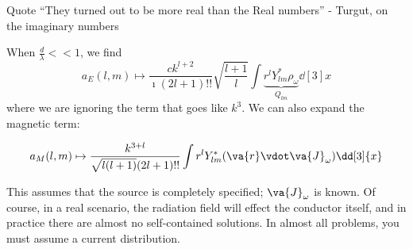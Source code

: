 \documentclass[a4paper,twoside,master.tex]{subfiles}
\begin{document}
\begin{note}{Quote}
    ``They turned out to be more real than the Real numbers''
    - Turgut, on the imaginary numbers
\end{note}

When $ \frac{d}{\lambda} << 1 $, we find
\begin{equation}
    a_E(l,m) \mapsto \frac{ck^{l+2}}{\imath (2l+1)!!} \sqrt{\frac{l+1}{l}} \int \underbrace{r^l Y_{lm}^* \rho_{\omega}}_{Q_{lm}} \dd[3]{x}
\end{equation}
where we are ignoring the term that goes like $ k^3 $. We can also expand the magnetic term:

\begin{equation}
    a_M(l,m) \mapsto \frac{k^{3+l}}{\sqrt{l(l+1)} (2l+1)!!} \int r^l Y_{lm}^*( \va{r} \vdot \va{J}_{\omega}) \dd[3]{x}
\end{equation}

This assumes that the source is completely specified; $ \va{J}_{\omega} $ is known. Of course, in a real scenario, the radiation field will effect the conductor itself, and in practice there are almost no self-contained solutions. In almost all problems, you must assume a current distribution.
\end{document}
